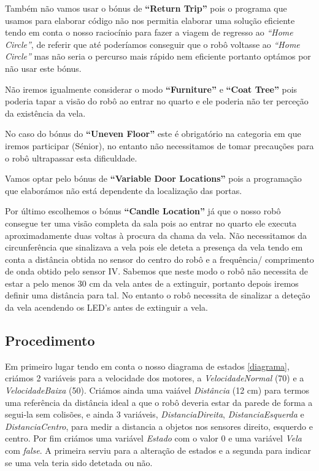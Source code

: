 \documentclass[pdftex,12pt,a4paper]{report}
\begin{document}
	Também não vamos usar o bónus de \textbf{“Return Trip”} pois o programa que usamos para elaborar código não nos permitia elaborar uma solução eficiente tendo em conta o nosso raciocínio para fazer a viagem de regresso ao \emph{“Home Circle”}, de referir que até poderíamos conseguir que o robô voltasse ao \emph{“Home Circle”} mas não seria o percurso mais rápido nem eficiente portanto optámos por não usar este bónus. 
	
	Não iremos igualmente considerar o modo \textbf{“Furniture”} e \textbf{“Coat Tree”} pois poderia tapar a visão do robô ao entrar no quarto e ele poderia não ter perceção da existência da vela.
	
	No caso do bónus do \textbf{“Uneven Floor”} este é obrigatório na categoria em que iremos participar (Sénior)\footnotemark{}, no entanto não necessitamos de tomar precauções para o robô ultrapassar esta dificuldade.
	
	Vamos optar pelo bónus de \textbf{“Variable Door Locations”} pois a programação que elaborámos não está dependente da localização das portas.
 	
 	Por último escolhemos o bónus \textbf{“Candle Location”} já que o nosso robô consegue ter uma visão completa da sala pois ao entrar no quarto ele executa aproximadamente duas voltas à procura da chama da vela. Não necessitamos da circunferência que sinalizava a vela pois ele deteta a presença da vela tendo em conta a distância obtida no sensor do centro do robô e a frequência/ comprimento de onda obtido pelo sensor IV. Sabemos que neste modo o robô não necessita de estar a pelo menos 30 cm da vela antes de a extinguir, portanto depois iremos definir uma distância para tal. No entanto o robô necessita de sinalizar a deteção da vela acendendo os LED's antes de extinguir a vela.

\subsection{Procedimento}

Em primeiro lugar tendo em conta o nosso diagrama de estados \ref{diagrama}, criámos 2 variáveis para a velocidade dos motores, a \emph{VelocidadeNormal} (70) e a \emph{VelocidadeBaixa} (50). Criámos ainda uma vaiável \emph{Distância} (12 cm) para termos uma referência da distância ideal a que o robô deveria estar da parede de forma a segui-la sem colisões, e ainda 3 variáveis, \emph{DistanciaDireita}, \emph{DistanciaEsquerda} e \emph{DistanciaCentro}, para medir a distancia a objetos nos sensores direito, esquerdo e centro. Por fim criámos uma variável \emph{Estado} com o valor 0 e uma variável \emph{Vela} com \emph{false}. A primeira serviu para a alteração de estados e a segunda para indicar se uma vela teria sido detetada ou não.
\end{document}
